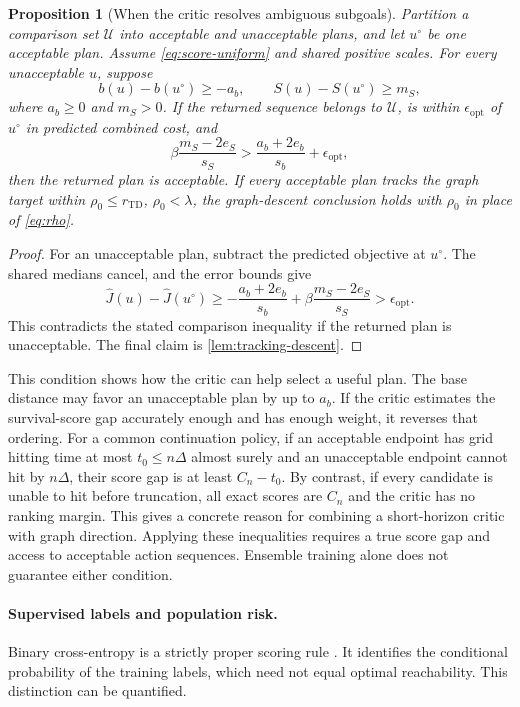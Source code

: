 \documentclass{article}
\newcommand{\Htd}{r_{\mathrm{TD}}}
\newtheorem{proposition}[theorem]{Proposition}
\theoremstyle{definition}
\theoremstyle{remark}
\begin{document}
\begin{proposition}[When the critic resolves ambiguous subgoals]
\label{prop:critic-screen}
Partition a comparison set $\mathcal U$ into acceptable and unacceptable plans,
and let $u^\circ$ be one acceptable plan.
Assume \cref{eq:score-uniform} and shared positive scales.
For every unacceptable $u$, suppose
\[
 b(u)-b(u^\circ)\ge-a_b,\qquad
 S(u)-S(u^\circ)\ge m_S,
\]
where $a_b\ge0$ and $m_S>0$.
If the returned sequence belongs to $\mathcal U$, is within
$\epsilon_{\mathrm{opt}}$ of $u^\circ$ in predicted combined cost, and
\begin{equation}
 \beta\frac{m_S-2e_S}{s_S}
   > \frac{a_b+2e_b}{s_b}+\epsilon_{\mathrm{opt}},
 \label{eq:critic-margin}
\end{equation}
then the returned plan is acceptable.
If every acceptable plan tracks the graph target within
$\rho_0\le\Htd$, $\rho_0<\lambda$, the graph-descent conclusion holds with
$\rho_0$ in place of \cref{eq:rho}.
\end{proposition}
\begin{proof}
For an unacceptable plan, subtract the predicted objective at $u^\circ$.
The shared medians cancel, and the error bounds give
\[
 \widehat J(u)-\widehat J(u^\circ)
 \ge-\frac{a_b+2e_b}{s_b}
       +\beta\frac{m_S-2e_S}{s_S}
 >\epsilon_{\mathrm{opt}} .
\]
This contradicts the stated comparison inequality if the returned plan is
unacceptable. The final claim is \cref{lem:tracking-descent}.
\end{proof}

This condition shows how the critic can help select a useful plan.
The base distance may favor an unacceptable plan by up to $a_b$. If the critic estimates
the survival-score gap accurately enough and has enough weight, it reverses that ordering.
For a common continuation policy, if an acceptable endpoint has grid
hitting time at most $t_0\le n\Delta$ almost surely and an unacceptable endpoint cannot
hit by $n\Delta$, their score gap is at least $C_n-t_0$.
By contrast, if every candidate is unable to hit before truncation, all exact scores
are $C_n$ and the critic has no ranking margin. This gives a concrete reason for
combining a short-horizon critic with graph direction.
Applying these inequalities requires a true score gap and access to acceptable action
sequences. Ensemble training alone does not guarantee either condition.

\paragraph{Supervised labels and population risk.}
Binary cross-entropy is a strictly proper scoring rule \citep{gneiting2007}.
It identifies the conditional probability of the training labels, which need
not equal optimal reachability. This distinction can be quantified.
\end{document}
